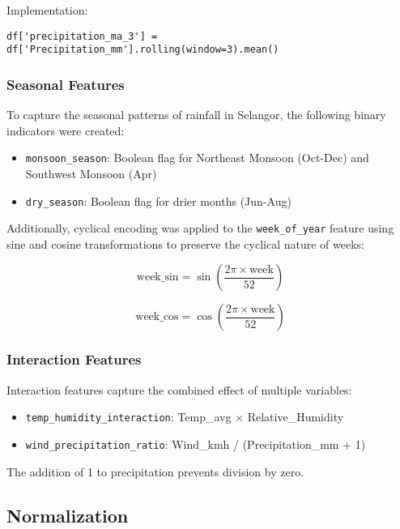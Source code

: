 \documentclass[12pt]{article}
\begin{document}
Implementation:
\begin{verbatim}
df['precipitation_ma_3'] = df['Precipitation_mm'].rolling(window=3).mean()
\end{verbatim}

\subsubsection{Seasonal Features}
\label{subsubsec:seasonal_features}

To capture the seasonal patterns of rainfall in Selangor, the following binary indicators were created:
\begin{itemize}
    \item \texttt{monsoon\_season}: Boolean flag for Northeast Monsoon (Oct-Dec) and Southwest Monsoon (Apr)
    \item \texttt{dry\_season}: Boolean flag for drier months (Jun-Aug)
\end{itemize}

Additionally, cyclical encoding was applied to the \texttt{week\_of\_year} feature using sine and cosine transformations to preserve the cyclical nature of weeks:

\begin{equation}
\text{week\_sin} = \sin\left(\frac{2\pi \times \text{week}}{52}\right)
\end{equation}

\begin{equation}
\text{week\_cos} = \cos\left(\frac{2\pi \times \text{week}}{52}\right)
\end{equation}

\subsubsection{Interaction Features}
\label{subsubsec:interaction_features}

Interaction features capture the combined effect of multiple variables:
\begin{itemize}
    \item \texttt{temp\_humidity\_interaction}: Temp\_avg $\times$ Relative\_Humidity
    \item \texttt{wind\_precipitation\_ratio}: Wind\_kmh / (Precipitation\_mm + 1)
\end{itemize}

The addition of 1 to precipitation prevents division by zero.

\subsection{Normalization}
\label{subsec:normalization}
\end{document}
